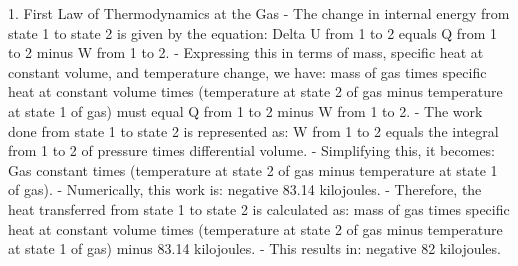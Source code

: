 1. First Law of Thermodynamics at the Gas
- The change in internal energy from state 1 to state 2 is given by the equation:
  Delta U from 1 to 2 equals Q from 1 to 2 minus W from 1 to 2.
- Expressing this in terms of mass, specific heat at constant volume, and temperature change, we have:
  mass of gas times specific heat at constant volume times (temperature at state 2 of gas minus temperature at state 1 of gas) must equal Q from 1 to 2 minus W from 1 to 2.
- The work done from state 1 to state 2 is represented as:
  W from 1 to 2 equals the integral from 1 to 2 of pressure times differential volume.
- Simplifying this, it becomes:
  Gas constant times (temperature at state 2 of gas minus temperature at state 1 of gas).
- Numerically, this work is:
  negative 83.14 kilojoules.
- Therefore, the heat transferred from state 1 to state 2 is calculated as:
  mass of gas times specific heat at constant volume times (temperature at state 2 of gas minus temperature at state 1 of gas) minus 83.14 kilojoules.
- This results in:
  negative 82 kilojoules.
